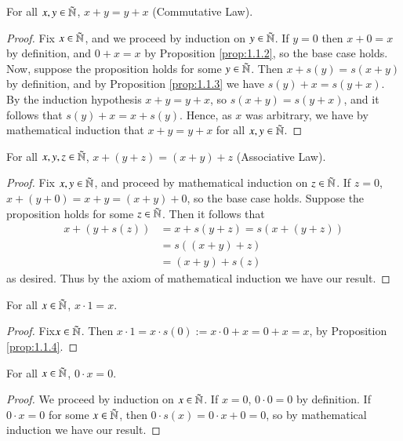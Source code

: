 \begin{proposition}\label{prop:1.1.4}
    For all $x, y \in \tilde{\mathbb N}$, $x+y = y+x$ (Commutative Law).
\end{proposition}
\begin{proof}
    Fix $x \in \tilde{\mathbb N}$, and we proceed by induction on $y \in \tilde{\mathbb N}$. If $y = 0$ then $x+0 = x$ by definition, and $0+x = x$ by Proposition \ref{prop:1.1.2}, so the base case holds. Now, suppose the proposition holds for some $y \in \tilde{\mathbb N}$. Then $x+s(y) = s(x+y)$ by definition, and by Proposition \ref{prop:1.1.3} we have $s(y)+x = s(y+x)$. By the induction hypothesis $x+y = y+x$, so $s(x+y) = s(y+x)$, and it follows that $s(y)+x = x+s(y)$. Hence, as $x$ was arbitrary, we have by mathematical induction that $x+y = y+x$ for all $x,y \in \tilde{\mathbb N}$.
\end{proof}

\begin{proposition}\label{prop:1.1.5}
    For all $x,y,z \in \tilde{\mathbb N}$, $x+(y+z) = (x+y)+z$ (Associative Law).
\end{proposition}
\begin{proof}
    Fix $x,y \in \tilde{\mathbb N}$, and proceed by mathematical induction on $z \in \tilde{\mathbb N}$. If $z = 0$, $x+(y+0) = x+y = (x+y)+0$, so the base case holds. Suppose the proposition holds for some $z \in \tilde{\mathbb N}$. Then it follows that \begin{align*}
        x+(y+s(z)) &= x + s(y+z) = s(x+(y+z)) \\
        &= s((x+y)+z) \tag{by Induction Hypothesis} \\
        &= (x+y)+s(z)
    \end{align*}
    as desired. Thus by the axiom of mathematical induction we have our result.
\end{proof}

\begin{proposition}\label{prop:1.1.6}
    For all $x \in \tilde{\mathbb N}$, $x\cdot 1 = x$.
\end{proposition}
\begin{proof}
    Fix$ x \in \tilde{\mathbb N}$. Then $x\cdot 1 = x\cdot s(0) := x\cdot 0 + x = 0 + x = x$, by Proposition \ref{prop:1.1.4}.
\end{proof}

\begin{proposition}\label{prop:1.1.7}
    For all $x \in \tilde{\mathbb N}$, $0\cdot x = 0$.
\end{proposition}
\begin{proof}
    We proceed by induction on $x \in \tilde{\mathbb N}$. If $x = 0$, $0\cdot 0 = 0$ by definition. If $0\cdot x = 0$ for some $x \in \tilde{\mathbb N}$, then $0 \cdot s(x) = 0\cdot x + 0 = 0$, so by mathematical induction we have our result.
\end{proof}

